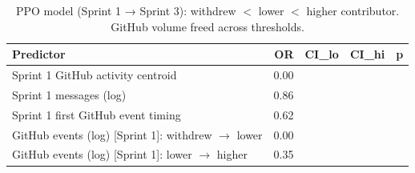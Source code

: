 \begin{table}[ht]
\centering
\begin{tabular}{lrrrr}
  \toprule
Predictor & OR & CI_lo & CI_hi & p \\ 
  \midrule
Sprint 1 GitHub activity centroid & 0.00 &  &  &  \\ 
  Sprint 1 messages (log) & 0.86 &  &  &  \\ 
  Sprint 1 first GitHub event timing & 0.62 &  &  &  \\ 
  GitHub events (log) [Sprint 1]: withdrew $\to$ lower & 0.00 &  &  &  \\ 
  GitHub events (log) [Sprint 1]: lower $\to$ higher & 0.35 &  &  &  \\ 
   \bottomrule
\end{tabular}
\caption{PPO model (Sprint 1 → Sprint 3): withdrew $<$ lower $<$ higher contributor. GitHub volume freed across thresholds.} 
\label{tab:ordered_s1s3}
\end{table}
